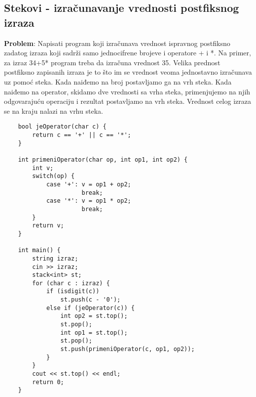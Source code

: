 \documentclass{article}
\begin{document}
\subsection{Stekovi - izračunavanje vrednosti postfiksnog izraza}
\textbf{Problem}: Napisati program koji izračunava vrednost ispravnog postfiksno zadatog izraza koji sadrži samo jednocifrene brojeve i operatore + i *. Na primer,
za izraz 34+5* program treba da izračuna vrednost 35.
\newline Velika prednost postfiksno
zapisanih izraza je to što im se vrednost veoma jednostavno izračunava uz
pomoć steka. Kada naiđemo na broj postavljamo ga na vrh steka. Kada
naiđemo na operator, skidamo dve vrednosti sa vrha steka, primenjujemo na
njih odgovarajuću operaciju i rezultat postavljamo na vrh steka. Vrednost celog izraza se na kraju nalazi na vrhu steka. 
\begin{lstlisting}
    bool jeOperator(char c) {
        return c == '+' || c == '*';
    }
    
    int primeniOperator(char op, int op1, int op2) {
        int v;
        switch(op) {
            case '+': v = op1 + op2; 
                      break;
            case '*': v = op1 * op2; 
                      break;
        }
        return v;
    }
    
    int main() {
        string izraz;
        cin >> izraz;
        stack<int> st;
        for (char c : izraz) {
            if (isdigit(c))
                st.push(c - '0');
            else if (jeOperator(c)) {
                int op2 = st.top(); 
                st.pop();
                int op1 = st.top(); 
                st.pop();
                st.push(primeniOperator(c, op1, op2));
            }
        }
        cout << st.top() << endl;
        return 0;
    }
\end{lstlisting}
\end{document}

